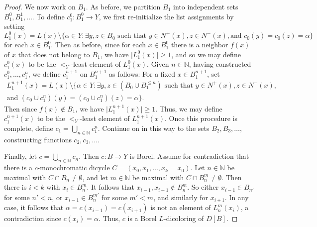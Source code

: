 \documentclass[10pt,a4paper]{amsart}
\newcommand{\N}{\mathbb N}
\begin{document}
\begin{proof}
    We now work on $B_1$. As before, we partition $B_1$ into independent sets $B_1^0, B_1^1, \dots$. To define $c_1^0 : B_1^0 \to Y$, we first re-initialize the list assignments by setting
    $$L_1^0(x) = L(x) \setminus \{\alpha \in Y : \exists y, z \in B_0 \text{ such that } y \in N^+(x), z \in N^-(x), \text{and } c_0(y) = c_0(z) = \alpha \}$$
    for each $x \in B_1^0$. Then as before, since for each $x \in B_1^0$ there is a neighbor $f(x)$ of $x$ that does not belong to $B_1$, we have $\vert L_1^0(x) \vert \geq 1$, and so we may define $c_1^0(x)$ to be the $<_Y$-least element of $L_1^0(x)$. Given $n \in \N$, having constructed $c_1^0, \dots, c_1^n$, we define $c_1^{n + 1}$ on $B_1^{n + 1}$ as follows: For a fixed $x \in B_1^{n + 1}$, set
    \begin{align*}
        L_1^{n + 1}(x) = L(x) \setminus \{\alpha \in Y : \exists y, z \in (B_0 \cup B_1^{\leq n}) \text{ such that } y \in N^+(x), z \in N^-(x), \\ \text{and } (c_0 \cup c_1^n)(y) = (c_0 \cup c_1^n)(z) = \alpha \}.
    \end{align*}
    Then since $f(x) \notin B_1$, we have $\vert L_1^{n + 1}(x) \vert \geq 1$. Thus, we may define $c_1^{n + 1}(x)$ to be the $<_Y$-least element of $L_1^{n + 1}(x)$. Once this procedure is complete, define $c_1 = \bigcup_{n \in \N} c_1^n$. Continue on in this way to the sets $B_2, B_3, \dots$, constructing functions $c_2, c_3, \dots$.

    Finally, let $c = \bigcup_{n \in \N} c_n$. Then $c : B \to Y$ is Borel. Assume for contradiction that there is a $c$-monochromatic dicycle $C = (x_0, x_1, \dots, x_k = x_0)$. Let $n \in \N$ be maximal with $C \cap B_n \neq \emptyset$, and let $m \in \N$ be maximal with $C \cap B_n^m \neq \emptyset$. Then there is $i < k$ with $x_i \in B_n^m$. It follows that $x_{i - 1}, x_{i + 1} \notin B_n^m$. So either $x_{i - 1} \in B_{n'}$ for some $n' < n$, or $x_{i - 1} \in B_n^{m'}$ for some $m' < m$, and similarly for $x_{i + 1}$. In any case, it follows that $\alpha = c(x_{i - 1}) = c(x_{i + 1})$ is not an element of $L_n^m(x_i)$, a contradiction since $c(x_i) = \alpha$. Thus, $c$ is a Borel $L$-dicoloring of $D[B]$.
\end{proof}
\end{document}
